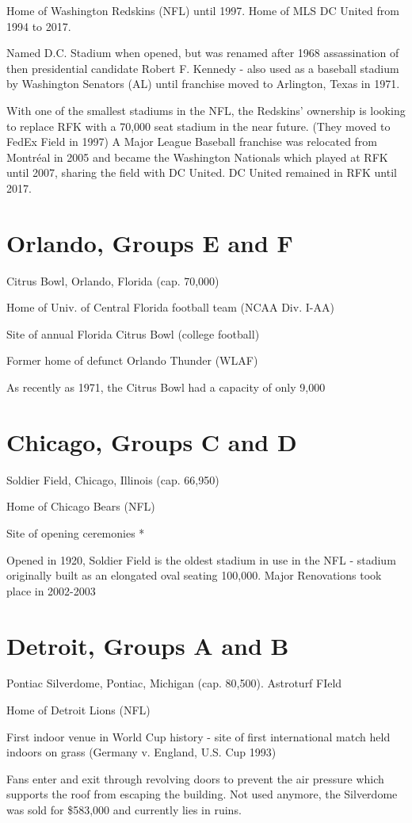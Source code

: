 Home of Washington Redskins (NFL) until 1997.  Home of MLS DC United from 1994 to 2017.

Named D.C. Stadium when opened, but was renamed after 1968 assassination of 
then presidential candidate Robert F. Kennedy - also used as a baseball stadium
by Washington Senators (AL) until franchise moved to Arlington, Texas in 1971.

With one of the smallest stadiums in the NFL, the Redskins' ownership is 
looking to replace RFK with a 70,000 seat stadium in the near future.  (They moved
to FedEx Field in 1997)  A Major League Baseball franchise was relocated from
Montr{\'e}al in 2005 and became the Washington Nationals which played at RFK until 2007,
sharing the field with DC United.  DC United remained in RFK until 2017.
\section{Orlando, Groups E and F}
Citrus Bowl, Orlando, Florida (cap. 70,000)

Home of Univ. of Central Florida football team (NCAA Div. I-AA)

Site of annual Florida Citrus Bowl (college football)

Former home of defunct Orlando Thunder (WLAF)

As recently as 1971, the Citrus Bowl had a capacity of only 9,000
\section{Chicago, Groups C and D}
Soldier Field, Chicago, Illinois (cap. 66,950)

Home of Chicago Bears (NFL)

Site of opening ceremonies *

Opened in 1920, Soldier Field is the oldest stadium in use in the NFL - stadium
originally built as an elongated oval seating 100,000.  Major Renovations took place 
in 2002-2003
\section{Detroit, Groups A and B}
Pontiac Silverdome, Pontiac, Michigan (cap. 80,500).  Astroturf FIeld

Home of Detroit Lions (NFL)

First indoor venue in World Cup history - site of first international match 
held indoors on grass (Germany v. England, U.S. Cup 1993)

Fans enter and exit through revolving doors to prevent the air pressure which 
supports the roof from escaping the building.  Not used anymore, the Silverdome was sold for \$583,000 and
currently lies in ruins.
